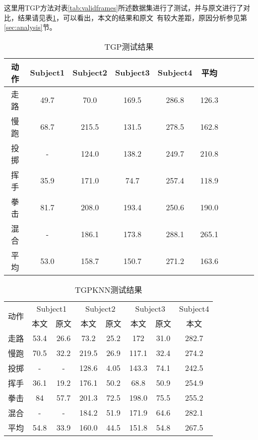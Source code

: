 这里用TGP方法对表\ref{tab:validframes}所述数据集进行了测试，并与原文进行了对比，结果请见表\ref{tab:TGPresult}，可以看出，本文的结果和原文~\cite{bo2010twin}有较大差距，原因分析参见第\ref{sec:analysis}节。
\begin{table}[H]
  \centering
  \caption{TGP测试结果}
  \label{tab:TGPresult}
    \begin{tabular}{cccccccccc}
      \toprule[1.5pt]
      动作 & Subject1 & Subject2 & Subject3 & Subject4 & 平均 \\\midrule[1pt]
      走路 & 49.7& 70.0& 169.5& 286.8& 126.3\\
      慢跑 & 68.7& 215.5& 131.5& 278.5 & 162.8\\
      投掷 & - & 124.0& 138.2& 249.7 & 210.8\\
      挥手 & 35.9& 171.0& 74.7& 257.4 & 118.9\\
      拳击 & 81.7& 208.0& 193.4& 250.6 & 190.0\\
      混合 & - & 186.1 & 173.8& 288.1 & 265.1\\
      平均 & 53.0& 158.7& 150.7& 271.2& 163.6\\
      \bottomrule[1.5pt]
    \end{tabular}
\end{table}

\begin{table}[H]
  \centering
  \caption{TGPKNN测试结果}
  \label{tab:TGPKNNresult}
    \begin{tabular}{cccccccc}
      \toprule[1.5pt]
      \multirow{2}{2em}{动作} & \multicolumn{2}{c}{Subject1} & \multicolumn{2}{c}{Subject2} & \multicolumn{2}{c}{Subject3} & Subject4\\
      & 本文 & 原文 & 本文 & 原文 & 本文 & 原文 & 本文 \\\midrule[1pt]
      走路 & 53.4& 26.6& 73.2& 25.2& 172& 31.0& 282.7\\
      慢跑 & 70.5& 32.2& 219.5& 26.9& 117.1& 32.4& 274.2\\
      投掷 & -& -& 128.6& 4.05& 143.3& 74.1& 242.5\\
      挥手 & 36.1& 19.2& 176.1& 50.2& 68.8& 50.9& 254.9\\
      拳击 & 84& 57.7& 201.3& 72.5& 198.0& 75.5& 255.2\\
      混合 & -& -& 184.2& 51.9& 171.9& 64.6& 282.1\\
      平均 & 54.8& 33.9& 160.0& 44.5& 151.8& 54.8& 267.5\\
      \bottomrule[1.5pt]
    \end{tabular}
\end{table}


